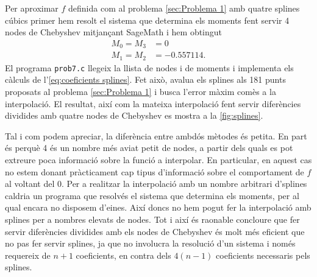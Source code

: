 \documentclass[12pt]{article}
\numberwithin{table}{section}
\numberwithin{figure}{section}
\numberwithin{equation}{section}
\begin{document}
Per aproximar \( f \) definida com al problema \ref{sec:Problema 1} amb quatre splines cúbics primer hem resolt el sistema que determina els moments fent servir 4 nodes de Chebyshev mitjançant \textsf{SageMath} i hem obtingut 
\begin{equation*}
\begin{aligned}
	M_0 = M_3 &= 0 \\
	M_1 = M_2 &= \num{-0.557114}.
\end{aligned}
\end{equation*}
El programa \texttt{prob7.c} llegeix la llista de nodes i de moments i implementa els càlculs de l'\cref{eq:coeficients splines}. Fet això, avalua els splines als 181 punts proposats al problema \ref{sec:Problema 1} i busca l'error màxim comès a la interpolació. El resultat, així com la mateixa interpolació fent servir diferències dividides amb quatre nodes de Chebyshev es mostra a la \cref{fig:splines}. 

Tal i com podem apreciar, la diferència entre ambdós mètodes és petita. En part és perquè 4 és un nombre més aviat petit de nodes, a partir dels quals es pot extreure poca informació sobre la funció a interpolar. En particular, en aquest cas no estem donant pràcticament cap tipus d'informació sobre el comportament de \( f \) al voltant del 0. Per a realitzar la interpolació amb un nombre arbitrari d'splines caldria un programa que resolvés el sistema que determina els moments, per al qual encara no disposem d'eines. Així doncs no hem pogut fer la interpolació amb splines per a nombres elevats de nodes. Tot i així és raonable concloure que fer servir diferències dividides amb els nodes de Chebyshev és molt més eficient que no pas fer servir splines, ja que no involucra la resolució d'un sistema i només requereix de \( n+1 \) coeficients, en contra dels \( 4(n - 1) \) coeficients necessaris pels splines.
\end{document}

